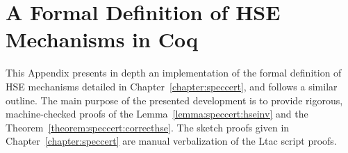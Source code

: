 \chapter{A Formal Definition of HSE Mechanisms in Coq}

This Appendix presents in depth an implementation of the formal definition of
HSE mechanisms detailed in Chapter~\ref{chapter:speccert}, and follows a similar
outline.
%
The main purpose of the presented development is to provide rigorous,
machine-checked proofs of the Lemma~\ref{lemma:speccert:hseinv} and the
Theorem~\ref{theorem:speccert:correcthse}.
%
The sketch proofs given in Chapter~\ref{chapter:speccert} are manual
verbalization of the {\sc Ltac} script proofs.

\inputminted{coq}{Listings/SpecCert.v}
